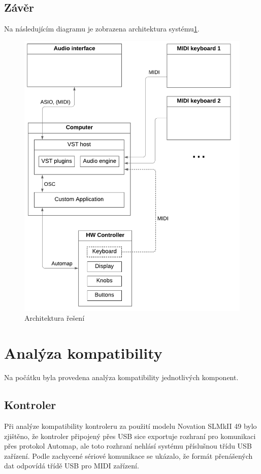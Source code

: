 \documentclass[thesis=M,czech]{FITthesis}[2019/03/06]
\begin{document}
		\subsection{Závěr}
			Na následujícím diagramu je zobrazena architektura systému\ref{fig:Architecture}.
			\begin{figure}[H]
				\centering
				\includegraphics[width=1\textwidth]{Architecture}
				\caption[Architektura řešení]{Architektura řešení}\label{fig:Architecture}
			\end{figure}
\clearpage
	\section{Analýza kompatibility}
		Na počátku byla provedena analýza kompatibility jednotlivých komponent. 
		
		\subsection{Kontroler}
		Při analýze kompatibility kontroleru za použití modelu Novation SLMkII 49 bylo zjištěno, že
		kontroler připojený přes USB sice exportuje rozhraní pro komunikaci přes protokol Automap,
		ale toto rozhraní nehlásí systému příslušnou třídu USB zařízení. Podle zachycené sériové komunikace
		se ukázalo, že formát přenášených dat odpovídá třídě USB pro MIDI zařízení\cite{usbmidi}.
		
\end{document}
